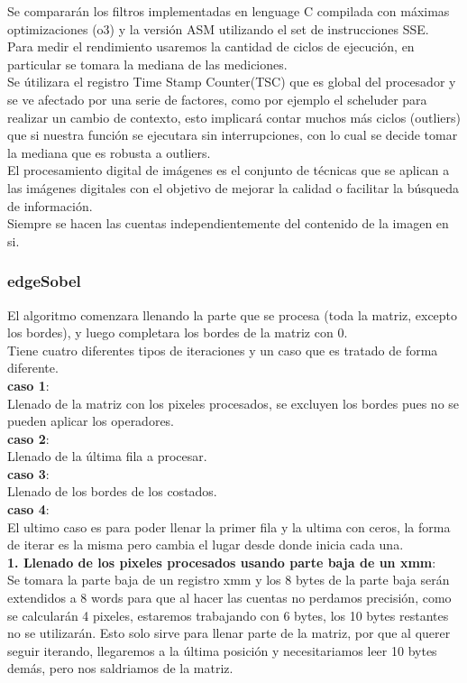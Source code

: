 
Se compararán los filtros implementadas en lenguage C compilada con máximas optimizaciones (o3) y la versión ASM utilizando el set de instrucciones
SSE. \\
Para medir el rendimiento usaremos la cantidad de ciclos de ejecución, en particular se tomara la mediana de las mediciones.\\
Se útilizara el registro Time Stamp Counter(TSC) que es global del procesador y se ve afectado por una serie de factores,
como por ejemplo el scheluder para realizar un cambio de contexto, esto implicará contar muchos más ciclos (outliers)
 que si nuestra función se ejecutara sin interrupciones, con lo cual se decide tomar la mediana que es robusta a outliers.\\
El procesamiento digital de imágenes es el conjunto de técnicas que se aplican a las imágenes digitales con el objetivo de mejorar la calidad o facilitar la búsqueda de información. 
\\
Siempre se hacen las cuentas independientemente del contenido de la imagen en si.\\

\subsubsection{edgeSobel}
El algoritmo comenzara llenando la parte que se procesa (toda la matriz, excepto los bordes),
y luego completara los bordes de la matriz con 0.\\
Tiene cuatro diferentes tipos de iteraciones y un caso que es tratado de forma diferente.\\
\textbf{caso 1}:\\
	Llenado de la matriz con los pixeles procesados, se excluyen los bordes pues no se pueden aplicar los operadores.\\
\textbf{caso 2}:\\
	Llenado de la última fila a procesar.\\
\textbf{caso 3}:\\
	Llenado de los bordes de los costados.\\
\textbf{caso 4}:\\
	El ultimo caso es para poder llenar la primer fila y la ultima con ceros, la forma de iterar es la misma pero cambia el lugar desde donde inicia cada una.\\

\textbf{1. Llenado de los pixeles procesados usando parte baja de un xmm}:\\ Se tomara la parte baja de un registro xmm y los 8 bytes de la parte baja serán extendidos a 8 words para que al hacer las cuentas no perdamos precisión, como se calcularán 4 pixeles, estaremos trabajando con 6 bytes, los 10 bytes restantes no se utilizarán. Esto solo sirve para llenar parte de la matriz, por que al querer seguir iterando, llegaremos a la última posición y necesitariamos leer 10 bytes demás, pero nos saldriamos de la matriz.\\

